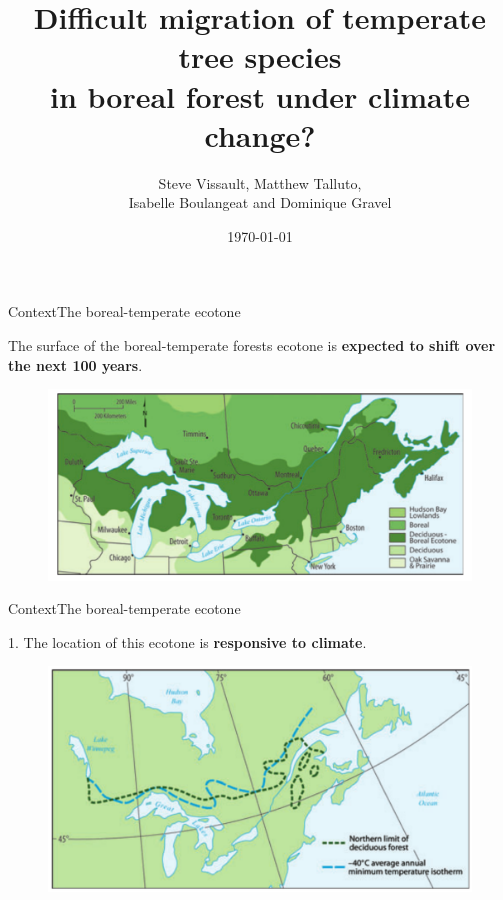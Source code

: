 \documentclass[10pt,aspectratio=149]{beamer}
\author{Steve Vissault, Matthew Talluto, \\
Isabelle Boulangeat and Dominique Gravel}
\title{Difficult migration of temperate tree species \\
in boreal forest under climate change?}
\date{\today}
\institute{Université du Québec à Rimouski}
\begin{document}
\begin{frame}[plain]
   \titlepage  
\end{frame}

	

\begin{frame}{Context}{The boreal-temperate ecotone}

The surface of the boreal-temperate forests ecotone is \textbf{expected to shift over the next 100 years}.

\begin{figure}
	\includegraphics[width=.70\paperwidth]{Figs/ecotone.pdf}
\end{figure}

\end{frame}




\begin{frame}{Context}{The boreal-temperate ecotone}

1. The location of this ecotone is \textbf{responsive to climate}.

\begin{figure}
	\includegraphics[width=.70\paperwidth]{Figs/climecotone.png}
\end{figure}

\end{frame}
\end{document}
